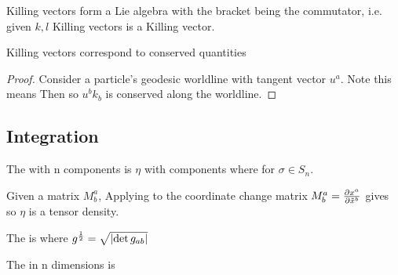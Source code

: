 \documentclass{article}
\begin{document}
\begin{lemma}
Killing vectors form a Lie algebra with the bracket being the commutator, i.e. given $k,l$ Killing vectors
is a Killing vector. 
\end{lemma}

\begin{lemma}
Killing vectors correspond to conserved quantities
\end{lemma}
\begin{proof}
Consider a particle's geodesic worldline with tangent vector $u^a$. Note this means 
Then 
so $u^b k_b$ is conserved along the worldline. 
\end{proof}
\subsection{Integration}

\begin{definition}
The  with n components is $\eta$ with components 
where
for $\sigma \in S_n$. 
\end{definition}

\begin{lemma}
Given a matrix $M^a_b$, 
Applying to the coordinate change matrix $M^a_b = \pd[x^a]{\tilde{x}^b}$ gives 
so $\eta$ is a tensor density. 
\end{lemma}

\begin{definition}
The  is 
where $g^\frac{1}{2} = \sqrt{\abs{\det g_{ab}}}$
\end{definition}

\begin{definition}
The  in n dimensions is  
\end{definition}
\end{document}

